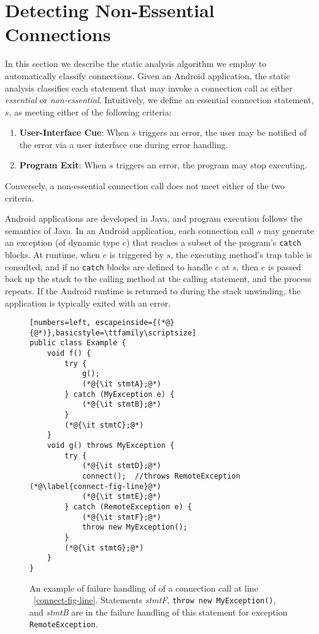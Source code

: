 \section{Detecting Non-Essential Connections}
\label{sec:analysis}

In this section we describe the static analysis algorithm we employ to
automatically classify connections.  Given an Android application, the
static analysis classifies each statement that may invoke a
connection call as either {\it essential} or {\it non-essential}.
Intuitively, we define an essential connection statement, $s$, as
meeting either of the following criteria:

\begin{enumerate}
\item{\bf User-Interface Cue}: When $s$ triggers an error, the user
may be notified of the error via a user interface cue during error
handling.
\item {\bf Program Exit}: When $s$ triggers an error, the program 
   may stop executing.  
\end{enumerate}

\noindent Conversely, a non-essential connection call does not meet
either of the two criteria.  

Android applications are developed in Java, and program execution
follows the semantics of Java. In an Android application, each
connection call $s$ may generate an exception (of dynamic type $e$)
that reaches a subset of the program's \lstinline!catch! blocks.  At
runtime, when $e$ is triggered by $s$, the executing method's trap
table is consulted, and if no \lstinline!catch! blocks are defined to
handle $e$ at $s$, then $e$ is passed back up the stack to the
calling method at the calling statement, and the process repeats.  If
the Android runtime is returned to during the stack unwinding, the
application is typically exited with an error.  


\begin{figure}
\begin{lstlisting}[numbers=left, escapeinside={(*@}{@*)},basicstyle=\ttfamily\scriptsize]
public class Example {
    void f() {
        try {
            g();
            (*@{\it stmtA};@*)
        } catch (MyException e) {
            (*@{\it stmtB};@*)
        }
        (*@{\it stmtC};@*)
    }
    void g() throws MyException {
        try {
            (*@{\it stmtD};@*)
            connect();  //throws RemoteException (*@\label{connect-fig-line}@*)
            (*@{\it stmtE};@*)
        } catch (RemoteException e) {
            (*@{\it stmtF};@*)
            throw new MyException();            
        }        
        (*@{\it stmtG};@*)
    }
}
\end{lstlisting}
\caption{\label{fig:failure-handling}An example of failure handling of
  of a connection call at line ~\ref{connect-fig-line}.  Statements
  {\it stmtF}, \lstinline!throw new MyException()!, and {\it stmtB}
  are in the failure handling of this statement for exception \lstinline!RemoteException!.
}
\end{figure}

